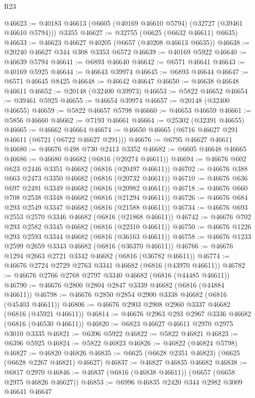 \begin{lexlean}{R23}
\begin{coremodule}
@46623 := @40183 @46613 (@6605 (@40169 @46610 @5794) (@32727 (@39461 @46610 @5794))) @3355
@46627 := @32755 (@6625 (@6632 @46611) @6635)
@46633 := @46623 @46627 @40205 (@6657 (@40208 @46613 @6635))
@46638 := @20240 @46627 @344 @308 @3353 @6572
@46639 := @40169 @5922
@46640 := @46639 @5794
@46641 := @6893 @46640
@46642 := @6571 @46641
@46643 := @40169 @5925
@46644 := @46643 @39974
@46645 := @6893 @46644
@46647 := @6571 @46645 @8425
@46648 := @46642 @46647
@46650 := @46638 @46648 @46611
@46652 := @20148 (@32400 @39973)
@46653 := @5822 @46652
@46654 := @39461 @5925
@46655 := @46654 @39974
@46657 := @20148 (@32400 @46655)
@46659 := @5822 @46657 @5798
@46660 := @46653 @46659
@46661 := @5856 @46660
@46662 := @7193 @46661
@46664 := @25302 (@32391 @46655)
@46665 := @46662 @46664
@46674 := @46650 @46665 (@6716 @46627 @291 @46611 (@6721 (@6722 @46627 @291)))
@46676 := @6795 @46627 @46611
@46680 := @46676 @498 @730 @2413 @3352
@46682 := @6605 @46648 @46665
@46686 := @46680 @46682 (@6816 (@20274 @46611))
@46694 := @46676 @602 @623 @2446 @3351 @46682 (@6816 (@20497 @46611))
@46702 := @46676 @388 @663 @2473 @3350 @46682 (@6816 (@20732 @46611))
@46710 := @46676 @636 @697 @2491 @3349 @46682 (@6816 (@20982 @46611))
@46718 := @46676 @660 @708 @2538 @3348 @46682 (@6816 (@21294 @46611))
@46726 := @46676 @684 @293 @2549 @3347 @46682 (@6816 (@21588 @46611))
@46734 := @46676 @693 @2553 @2570 @3346 @46682 (@6816 (@21868 @46611))
@46742 := @46676 @702 @293 @2582 @3345 @46682 (@6816 (@22310 @46611))
@46750 := @46676 @1226 @293 @2593 @3344 @46682 (@6816 (@36163 @46611))
@46758 := @46676 @1233 @2599 @2659 @3343 @46682 (@6816 (@36370 @46611))
@46766 := @46676 @1294 @2663 @2721 @3342 @46682 (@6816 (@36782 @46611))
@46774 := @46676 @2724 @2729 @2763 @3341 @46682 (@6816 (@43970 @46611))
@46782 := @46676 @2766 @2768 @2797 @3340 @46682 (@6816 (@44485 @46611))
@46790 := @46676 @2800 @2804 @2847 @3339 @46682 (@6816 (@44884 @46611))
@46798 := @46676 @2850 @2854 @2900 @3338 @46682 (@6816 (@45403 @46611))
@46806 := @46676 @2903 @2908 @2960 @3337 @46682 (@6816 (@45921 @46611))
@46814 := @46676 @2963 @293 @2967 @3336 @46682 (@6816 (@46530 @46611))
@46820 := @6823 @46627 @46611 @2970 @2975 @3010 @3335
@46821 := @6396 @5922
@46822 := @5822 @46821
@46823 := @6396 @5925
@46824 := @5822 @46823
@46826 := @46822 (@46824 @5798)
@46827 := @46820 @46826
@46835 := @6625 (@6628 @2351 @46823) (@6625 (@6628 @2267 @46821) @46627)
@46837 := @46827 @46835 @46682
@46838 := @6817 @2970
@46846 := @46837 (@6816 (@46838 @46611)) (@6657 (@6658 @2975 @46826 @46627))
@46853 := @6996 @46835 @2420 @344 @2982 @3009 @46641 @46647

\end{coremodule}
\end{lexlean}
